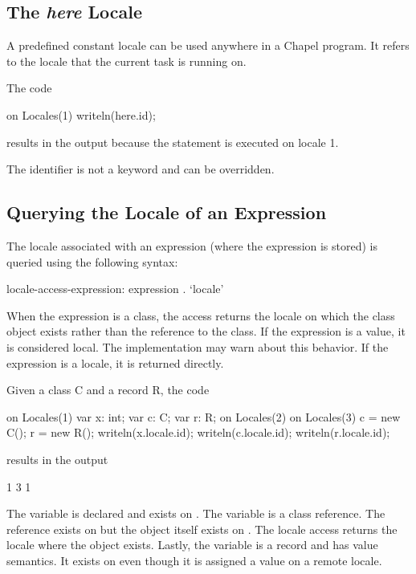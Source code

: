 \subsection{The {\em here} Locale}
\label{here}

A predefined constant locale  can be used anywhere in a
Chapel program.  It refers to the locale that the current task is
running on.

\begin{example}
The code
\begin{chapel}
on Locales(1) {
  writeln(here.id);
}
\end{chapel}
results in the output  because the  statement is
executed on locale 1.
\end{example}

The identifier  is not a keyword and can be overridden.

\subsection{Querying the Locale of an Expression}
\label{Querying_the_Locale_of_a_Variable}

The locale associated with an expression (where the expression is
stored) is queried using the following syntax:
\begin{syntax}
locale-access-expression:
  expression . `locale'
\end{syntax}
When the expression is a class, the access returns the locale on which
the class object exists rather than the reference to the class.  If
the expression is a value, it is considered local.  The implementation
may warn about this behavior.  If the expression is a locale, it is
returned directly.

\begin{example}
Given a class C and a record R, the code
\begin{chapel}
on Locales(1) {
  var x: int;
  var c: C;
  var r: R;
  on Locales(2) {
    on Locales(3) {
      c = new C();
      r = new R();
    }
    writeln(x.locale.id);
    writeln(c.locale.id);
    writeln(r.locale.id);
  }
}
\end{chapel}
results in the output
\begin{chapelprintoutput}{}
1
3
1
\end{chapelprintoutput}
The variable  is declared and exists on .
The variable  is a class reference.  The reference exists
on  but the object itself exists
on .  The locale access returns the locale where the
object exists.  Lastly, the variable  is a record and has
value semantics.  It exists on  even though it is
assigned a value on a remote locale.
\end{example}

